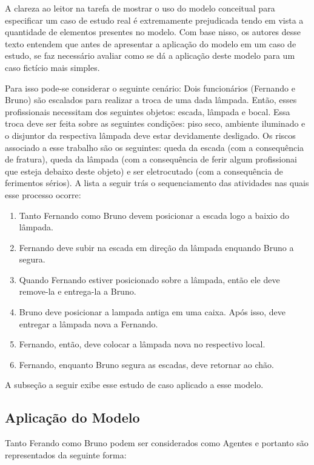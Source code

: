 A clareza ao leitor na tarefa de mostrar o uso do modelo conceitual para especificar um caso de estudo real é extremamente prejudicada tendo em vista a quantidade de elementos presentes no modelo. Com base nisso, os autores desse texto entendem que antes de apresentar a aplicação do modelo em um caso de estudo, se faz necessário avaliar como se dá a aplicação deste modelo para um caso fictício mais simples. 

Para isso pode-se considerar o seguinte cenário: Dois funcionários (Fernando e Bruno) são escalados para realizar a troca de uma dada lâmpada. Então, esses profissionais necessitam dos seguintes objetos: escada, lâmpada e bocal. Essa troca deve ser feita sobre as seguintes condições: piso seco, ambiente iluminado e o disjuntor da respectiva lâmpada deve estar devidamente desligado. Os riscos associado a esse trabalho são os seguintes: queda da escada (com a consequência de fratura), queda da lâmpada (com a consequência de ferir algum profissionai que esteja debaixo deste objeto) e ser eletrocutado (com a consequência de ferimentos sérios). A lista a seguir trás o sequenciamento das atividades nas quais esse processo ocorre:

\begin{enumerate}
	\item Tanto Fernando como Bruno devem posicionar a escada logo a baixio do lâmpada. 
	\item Fernando deve subir na escada em direção da lâmpada enquando Bruno a segura. 
	\item Quando Fernando estiver posicionado sobre a lâmpada, então ele deve remove-la e entrega-la a Bruno. 
	\item Bruno deve posicionar a lampada antiga em uma caixa. Após isso, deve entregar a lâmpada nova a Fernando.
	\item Fernando, então, deve colocar a lâmpada nova no respectivo local. 
	\item Fernando, enquanto Bruno segura as escadas, deve retornar ao chão. 
\end{enumerate}

A subseção a seguir exibe esse estudo de caso aplicado a esse modelo. 

\subsection{Aplicação do Modelo}

Tanto Ferando como Bruno podem ser considerados como Agentes e portanto são representados da seguinte forma:

